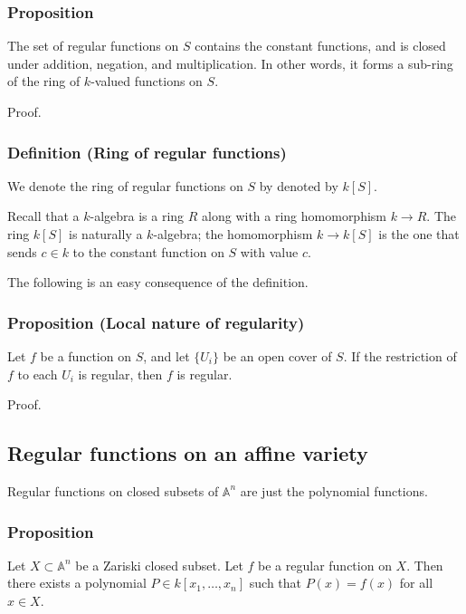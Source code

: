 \documentclass[11pt]{article}
\begin{document}
\subsubsection{Proposition}
\label{sec:org2e6a76e}
The set of regular functions on \(S\) contains the constant functions, and is closed under addition, negation, and multiplication.
In other words, it forms a sub-ring of the ring of \(k\)-valued functions on \(S\).

\begin{skipped}
Proof.
\end{skipped}

\subsubsection{Definition (Ring of regular functions)}
\label{sec:org62c8024}
We denote the ring of regular functions on \(S\) by denoted by \(k[S]\).


Recall that a \(k\)-algebra is a ring \(R\) along with a ring homomorphism \(k \to R\).
The ring \(k[S]\) is naturally a \(k\)-algebra; the homomorphism \(k \to k[S]\) is the one that sends \(c \in k\) to the constant function on \(S\) with value \(c\).

The following is an easy consequence of the definition.
\subsubsection{Proposition (Local nature of regularity)}
\label{sec:org4c8650e}
Let \(f\) be a function on \(S\), and let \(\{U_i\}\) be an open cover of \(S\).
If the restriction of \(f\) to each \(U_i\) is regular, then \(f\) is regular.

\begin{skipped}
Proof.
\end{skipped}

\subsection{Regular functions on an affine variety}
\label{sec:org7166485}
Regular functions on closed subsets of \(\mathbb A^n\) are just the polynomial functions.
\subsubsection{Proposition}
\label{sec:org6438f2f}
 \label{regular_on_affine}
Let \(X \subset \mathbb A^n\) be a Zariski closed subset.
Let \(f\) be a regular function on \(X\).
Then there exists a polynomial \(P \in k[x_1,\dots,x_n]\) such that \(P(x) = f(x)\) for all \(x \in X\).
\end{document}
